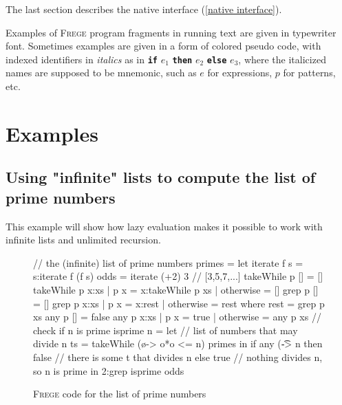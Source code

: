 \documentclass[a4paper,landscape,twocolumn]{report}
\newenvironment{code}[0]{\verbatim}{\endverbatim}
\newcommand{\frege}[0]{\textsc{Frege}}
\newcommand{\qq}[1]{"#1"}
\newcommand{\term}[1]{\textbf{\texttt{\textcolor{trmred}{#1}}}}
\begin{document}
The last section describes  the native interface
(\autoref{native interface}).

Examples of \frege{} program fragments in running text are given in
typewriter font. Sometimes examples are given in a form of
colored pseudo code,
with indexed identifiers in \emph{italics} as in \term{if} $e_1$
\term{then} $e_2$ \term{else} $e_3$, where the  italicized names are
supposed to be mnemonic, such as $e$ for expressions, $p$ for patterns,
etc.






%


\appendix


\chapter{Examples}
\section{Using \qq{infinite} lists to compute the list of prime numbers}
\label{example1}
This example will show how lazy evaluation makes it possible to work
with infinite lists and unlimited recursion.

\begin{figure}[hbt]
\begin{code}
// the (infinite) list of prime numbers
primes = let
          iterate f s = s:iterate f (f s)
          odds = iterate (+2) 3   // [3,5,7,...]
          takeWhile p [] = []
          takeWhile p x:xs
            | p x       = x:takeWhile p xs
            | otherwise = []
          grep p []     = []
          grep p x:xs
            | p x       = x:rest
            | otherwise = rest
            where
                rest = grep p xs
          any p []      = false
          any p x:xs
            | p x       = true
            | otherwise = any p xs
          // check if n is prime
          isprime n = let
            // list of numbers that may divide n
            ts = takeWhile (\o -> o*o <= n) primes
          in if any (\t -> n%
            then false   // there is some t that divides n
            else true    // nothing divides n, so n is prime
    in 2:grep isprime odds
\end{code}
\caption{\frege{} code for the list of prime numbers}
\label{primes}
\end{figure}
\end{document}
